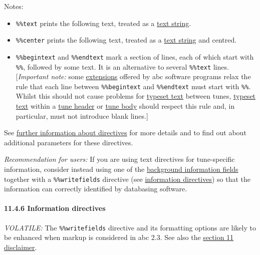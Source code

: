 Notes:

\begin{itemize}
\item
  \texttt{\%\%text} prints the following text, treated as a
  \protect\hyperlink{text_string_definition}{text string}.
\item
  \texttt{\%\%center} prints the following text, treated as a
  \protect\hyperlink{text_string_definition}{text string} and centred.
\item
  \texttt{\%\%begintext} and \texttt{\%\%endtext} mark a section of
  lines, each of which start with \texttt{\%\%}, followed by some text.
  It is an alternative to several \texttt{\%\%text} lines.
  {[}\emph{Important note:} some
  \protect\hyperlink{abc_extensions}{extensions} offered by abc software
  programs relax the rule that each line between \texttt{\%\%begintext}
  and \texttt{\%\%endtext} must start with \texttt{\%\%}. Whilst this
  should not cause problems for
  \protect\hyperlink{typeset_text_definition}{typeset text} between
  tunes, \protect\hyperlink{typeset_text_definition}{typeset text}
  within a \protect\hyperlink{tune_header_definition}{tune header} or
  \protect\hyperlink{tune_body_definition}{tune body} should respect
  this rule and, in particular, must not introduce blank lines.{]}
\end{itemize}

See \protect\hyperlink{further_information_about_directives}{further
information about directives} for more details and to find out about
additional parameters for these directives.

\emph{Recommendation for users:} If you are using text directives for
tune-specific information, consider instead using one of the
\protect\hyperlink{bdfsbackground_information}{background information
fields} together with a \texttt{\%\%writefields} directive (see
\protect\hyperlink{information_directives}{information directives}) so
that the information can correctly identified by databasing software.

\hypertarget{information_directives}{\paragraph{11.4.6 Information
directives}\label{information_directives}}

\emph{VOLATILE:} The \texttt{\%\%writefields} directive and its
formatting options are likely to be enhanced when markup is considered
in abc 2.3. See also the \protect\hyperlink{disclaimer}{section 11
disclaimer}.

